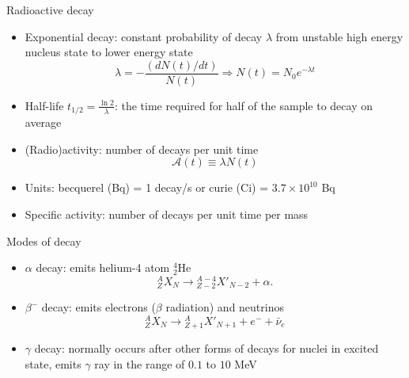 \documentclass[10pt]{beamer}
\begin{document}
\begin{frame}{Radioactive decay}
\begin{itemize}[<+->]
\item Exponential decay: constant probability of decay $\lambda$ from unstable high
energy nucleus state to lower energy state
\[\lambda = -\frac{(dN(t)/dt)}{N(t)} \Rightarrow N(t)=N_0 e^{-\lambda t}\]
\item Half-life $t_{1/2}=\frac{\ln 2}{\lambda}$: the time required for half of the sample to decay on average
\item{(Radio)activity: number of decays per unit time}
\[\mathcal{A}(t)\equiv \lambda N(t)\]
\item Units: becquerel (Bq) = 1 decay/s or curie (Ci) = $3.7\times 10^{10}$ Bq
\item Specific activity: number of decays per unit time per mass
\end{itemize}
\end{frame}

\begin{frame}{Modes of decay}
\begin{itemize}[<+->]
\item $\alpha$ decay: emits helium-4 atom ${}^4_2$He
\[{}^A_Z X_N \rightarrow {}^{A-4}_{Z-2}X'_{N-2} + \alpha.\]
\item $\beta^-$ decay: emits electrons ($\beta$ radiation) and neutrinos  
\[{}^A_Z X_N \rightarrow {}^A_{Z+1} X'_{N+1} + e^- + \bar{\nu}_e\]
\item $\gamma$ decay: normally occurs after other forms of decays for nuclei in excited state,
emits $\gamma$ ray in the range of $0.1$ to $10$ MeV
\end{itemize}
\end{frame}
\end{document}
